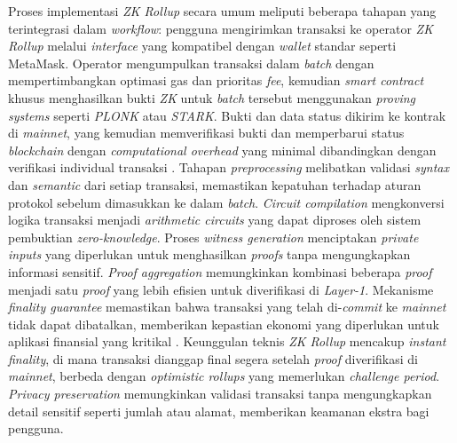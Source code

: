 Proses implementasi \emph{ZK Rollup} secara umum meliputi beberapa tahapan yang
terintegrasi dalam \emph{workflow}: pengguna mengirimkan transaksi ke operator
\emph{ZK Rollup} melalui \emph{interface} yang kompatibel dengan \emph{wallet}
standar seperti MetaMask. Operator mengumpulkan transaksi dalam \emph{batch}
dengan mempertimbangkan optimasi gas dan prioritas \emph{fee}, kemudian
\emph{smart contract} khusus menghasilkan bukti \emph{ZK} untuk \emph{batch}
tersebut menggunakan \emph{proving systems} seperti \emph{PLONK} atau
\emph{STARK}. Bukti dan data status dikirim ke kontrak di \emph{mainnet}, yang
kemudian memverifikasi bukti dan memperbarui status \emph{blockchain} dengan
\emph{computational overhead} yang minimal dibandingkan dengan verifikasi
individual transaksi \parencite{polygon2024}. Tahapan \emph{preprocessing}
melibatkan validasi \emph{syntax} dan \emph{semantic} dari setiap transaksi,
memastikan kepatuhan terhadap aturan protokol sebelum dimasukkan ke dalam
\emph{batch}. \emph{Circuit compilation} mengkonversi logika transaksi menjadi
\emph{arithmetic circuits} yang dapat diproses oleh sistem pembuktian
\emph{zero-knowledge}. Proses \emph{witness generation} menciptakan
\emph{private inputs} yang diperlukan untuk menghasilkan \emph{proofs} tanpa
mengungkapkan informasi sensitif. \emph{Proof aggregation} memungkinkan
kombinasi beberapa \emph{proof} menjadi satu \emph{proof} yang lebih efisien
untuk diverifikasi di \emph{Layer-1}. Mekanisme \emph{finality guarantee}
memastikan bahwa transaksi yang telah di-\emph{commit} ke \emph{mainnet} tidak
dapat dibatalkan, memberikan kepastian ekonomi yang diperlukan untuk aplikasi
finansial yang kritikal \parencite{Buterin2016}. Keunggulan teknis \emph{ZK
  Rollup} mencakup \emph{instant finality}, di mana transaksi dianggap final
segera setelah \emph{proof} diverifikasi di \emph{mainnet}, berbeda dengan
\emph{optimistic rollups} yang memerlukan \emph{challenge period}.
\emph{Privacy preservation} memungkinkan validasi transaksi tanpa mengungkapkan
detail sensitif seperti jumlah atau alamat, memberikan keamanan ekstra bagi
pengguna.

